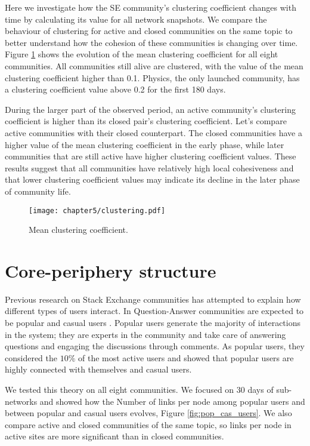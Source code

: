 Here we investigate how the SE community’s clustering coefficient changes with time by calculating its value for all network snapshots. We compare the behaviour of clustering for active and closed communities on the same topic to better understand how the cohesion of these communities is changing over time. Figure \ref{fig:clustering} shows the evolution of the mean clustering coefficient for all eight communities. All communities still alive are clustered, with the value of the mean clustering coefficient higher than 0.1. Physics, the only launched community, has a clustering coefficient value above 0.2 for the first 180 days.

During the larger part of the observed period, an active community’s clustering coefficient is higher than its closed pair’s clustering coefficient. Let’s compare active communities with their closed counterpart. The closed communities have a higher value of the mean clustering coefficient in the early phase, while later communities that are still active have higher clustering coefficient values. These results suggest that all communities have relatively high local cohesiveness and that lower clustering coefficient values may indicate its decline in the later phase of community life. 

\begin{figure}
	\centering
	\texttt{[image: chapter5/clustering.pdf]}%
	\caption{Mean clustering coefficient.}
	\label{fig:clustering}
\end{figure}

\section{Core-periphery structure}

Previous research on Stack Exchange communities has attempted to explain how different types of users interact. In Question-Answer communities are expected to be popular and casual users \cite{santos2019activity, santos2019self}. Popular users generate the majority of interactions in the system; they are experts in the community and take care of answering questions and engaging the discussions through comments. As popular users, they considered the $10 \%$ of the most active users and showed that popular users are highly connected with themselves and casual users.

We tested this theory on all eight communities. We focused on 30 days of sub-networks and showed how the Number of links per node among popular users and between popular and casual users evolves, Figure \ref{fig:pop_cas_users}. We also compare active and closed communities of the same topic, so links per node in active sites are more significant than in closed communities.

